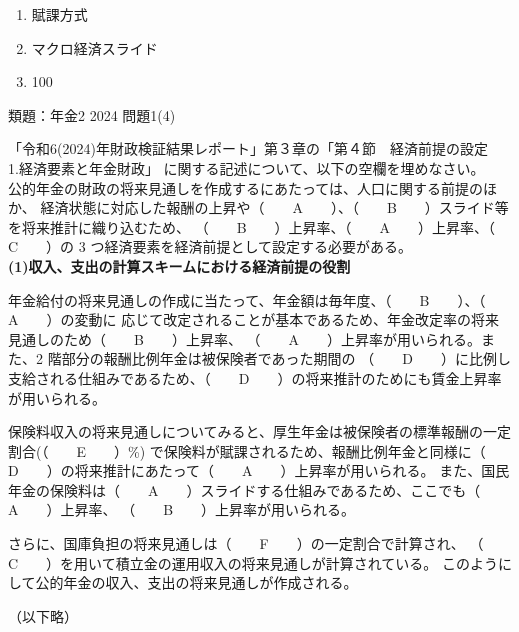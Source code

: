 \begin{answerbox}
  \begin{enumerate}[A: ]
    \item 賦課方式
    \item マクロ経済スライド
    \item 100
  \end{enumerate}
\end{answerbox}

\begin{explanationbox}
  類題：年金2 2024 問題1(4)
\end{explanationbox}

\begin{fillblank}[数理人試験 2024 問題1 設問7 改題]
  「令和6(2024)年財政検証結果レポート」第３章の「第４節　経済前提の設定　1.経済要素と年金財政」
  に関する記述について、以下の空欄を埋めなさい。
  \\

公的年金の財政の将来見通しを作成するにあたっては、人口に関する前提のほか、
経済状態に対応した報酬の上昇や（　　A　　）、（　　B　　）スライド等を将来推計に織り込むため、
（　　B　　）上昇率、（　　A　　）上昇率、（　　C　　）の 3 つ経済要素を経済前提として設定する必要がある。
\\

\noindent \textbf{(1)収入、支出の計算スキームにおける経済前提の役割}

年金給付の将来見通しの作成に当たって、年金額は毎年度、（　　B　　）、（　　A　　）の変動に
応じて改定されることが基本であるため、年金改定率の将来見通しのため（　　B　　）上昇率、
（　　A　　）上昇率が用いられる。また、2 階部分の報酬比例年金は被保険者であった期間の
（　　D　　）に比例し支給される仕組みであるため、（　　D　　）の将来推計のためにも賃金上昇率が用いられる。

保険料収入の将来見通しについてみると、厚生年金は被保険者の標準報酬の一定割合(（　　E　　）\%)
で保険料が賦課されるため、報酬比例年金と同様に（　　D　　）の将来推計にあたって（　　A　　）上昇率が用いられる。
また、国民年金の保険料は（　　A　　）スライドする仕組みであるため、ここでも（　　A　　）上昇率、
（　　B　　）上昇率が用いられる。

さらに、国庫負担の将来見通しは（　　F　　）の一定割合で計算され、
（　　C　　）を用いて積立金の運用収入の将来見通しが計算されている。
このようにして公的年金の収入、支出の将来見通しが作成される。


（以下略）

\end{fillblank}

